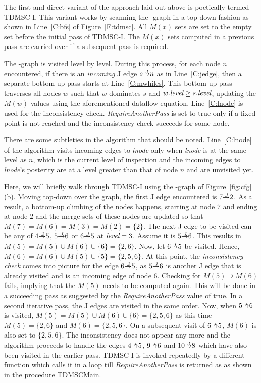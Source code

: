 {The first and direct variant of the approach laid out above is poetically 
termed TDMSC-I. This variant works by scanning the \DJ-graph in a top-down 
fashion as shown in Line~\ref{C:bfs} of Figure~\ref{F:tdmsc}. All $M(x)$ sets 
are set to the empty set before the initial pass of TDMSC-I. The $M(x)$ sets 
computed in a previous pass are carried over if a subsequent pass is required. 

The \DJ-graph is visited
level by level. During this process, for each node $n$ encountered, if there is 
an \emph{incoming}
J edge $s \st{J} n$ as in Line~\ref{C:jedge}, then a separate bottom-up pass starts at 
Line~\ref{C:mwhiles}. This bottom-up pass traverses all nodes $w$ such that $w$ 
dominates $s$ and $w.\textit{level} \geq s.\textit{level}$,
updating the $M(w)$ values using the aforementioned dataflow equation. Line~\ref{C:lnode} is used for
the inconsistency check. \textit{RequireAnotherPass} is set to true only if a fixed point is not reached
and the inconsistency check succeeds for some node.

There are some subtleties in the algorithm that should be noted. 
Line~\ref{C:lnode} of the algorithm visits incoming edges to \textit{lnode} 
only when \textit{lnode} is at the same level as $n$, which is the current 
level of inspection and the incoming edges to \textit{lnode}'s posterity are at 
a level greater than that of node $n$ and are unvisited yet. 

Here, we will briefly walk through TDMSC-I using the \DJ-graph of Figure~\ref{fig:cfg}(b). Moving top-down over the graph, the first J edge encountered is $7 \st{J} 2$. As a result, a bottom-up climbing of the nodes happens, starting at node $7$ and
ending at node $2$ and the merge sets of these nodes are updated so that $M(7) = M(6) = M(3) = M(2) = \{2\}$. The next J edge
to be visited can be any of $4 \st{J} 5$, $5 \st{J} 6$ or $6 \st{J} 5$ at 
$\textit{level} = 3$. Assume it is $5 \st{J} 6$. This results in $M(5) = M(5) \cup M(6) 
\cup \{6\} = \{2,6\}$. Now, let $6 \st{J} 5$ be visited. Hence, $M(6) = M(6) 
\cup M(5) \cup \{5\} = \{2,5,6\}$. At this point, the \emph{inconsistency check} 
comes into picture for the edge $6 \st{J} 5$, as $5 \st{J} 6$ is another J edge 
that is already visited and is an incoming edge of node $6$. Checking for $M(5) 
\supseteq M(6)$ fails, implying that the $M(5)$ needs to be computed again. 
This will be done in a succeeding pass as suggested by the 
\textit{RequireAnotherPass} value of true. In a second iterative pass, the J edges are visited in the same order. Now, when $5 \st{J} 6$ is visited, 
$M(5) = M(5) \cup M(6) \cup \{6\} = \{2,5,6\}$ as this time 
$M(5) = \{2,6\}$ 
and $M(6) = \{2,5,6\}$. On a subsequent visit of $6 \st{J} 5$, $M(6)$ is also set to $\{2,5,6\}$. The inconsistency does not appear any more and the algorithm proceeds to handle the edges $4 \st{J} 5$, $9 \st{J} 6$ and $10 \st{J} 8$ which have
also been visited in the earlier pass. TDMSC-I is invoked repeatedly by a different function
which calls it in a loop till \textit{RequireAnotherPass} is returned as \false as shown in the procedure TDMSCMain.

}
